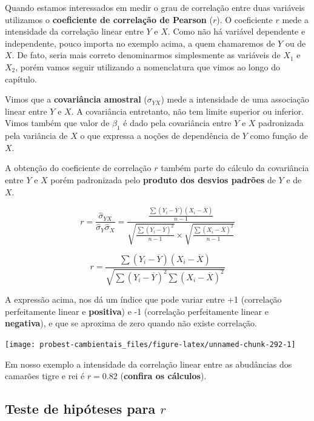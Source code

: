 \documentclass[
]{book}
\begin{document}
Quando estamos interessados em medir o grau de correlação entre duas variáveis utilizamos o \textbf{coeficiente de correlação de Pearson} (\textbf{\(r\)}). O coeficiente \(r\) mede a intensidade da correlação linear entre \(Y\) e \(X\). Como não há variável dependente e independente, pouco importa no exemplo acima, a quem chamaremos de \(Y\) ou de \(X\). De fato, seria mais correto denominarmos simplesmente as variáveis de \(X_1\) e \(X_2\), porém vamos seguir utilizando a nomenclatura que vimos ao longo do capítulo.

Vimos que a \textbf{covariância amostral} (\(\sigma_{YX}\)) mede a intensidade de uma associação linear entre \(Y\) e \(X\). A covariância entretanto, não tem limite superior ou inferior. Vimos também que valor de \(\beta_1\) é dado pela covariância entre \(Y\) e \(X\) padronizada pela variância de \(X\) o que expressa a noções de dependência de \(Y\) como função de \(X\).

A obtenção do coeficiente de correlação \(r\) também parte do cálculo da covariância entre \(Y\) e \(X\) porém padronizada pelo \textbf{produto dos desvios padrões} de \(Y\) e de \(X\).

\[r = \frac{\hat{\sigma}_{YX}}{\hat{\sigma}_Y \hat{\sigma}_X} = 
\frac{\frac{\sum{(Y_i - \overline{Y})(X_i - \overline{X})}}{n-1}}
{\sqrt{\frac{\sum{(Y_i - \overline{Y})^2}}{n-1}}  \times 
\sqrt{\frac{\sum{(X_i - \overline{X})^2}}{n-1}}}\]

\[r = \frac{\sum{(Y_i - \overline{Y})(X_i - \overline{X})}}{\sqrt{\sum{(Y_i - \overline{Y})^2 \sum{(X_i - \overline{X})^2}}}}\]

A expressão acima, nos dá um índice que pode variar entre +1 (correlação perfeitamente linear e \textbf{positiva}) e -1 (correlação perfeitamente linear e \textbf{negativa}), e que se aproxima de zero quando não existe correlação.

\begin{center}\texttt{[image: probest-cambientais\_files/figure-latex/unnamed-chunk-292-1]} \end{center}

Em nosso exemplo a intensidade da correlação linear entre as abudâncias dos camarões tigre e rei é \(r = 0.82\) (\textbf{confira os cálculos}).

\hypertarget{teste-de-hipuxf3teses-para-r}{%
\subsection{\texorpdfstring{Teste de hipóteses para \(r\)}{Teste de hipóteses para r}}\label{teste-de-hipuxf3teses-para-r}}
\end{document}
